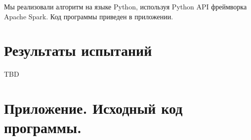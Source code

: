 \documentclass[12pt,a4paper]{report}
\begin{document}
Мы реализовали алгоритм на языке Python, используя Python API фреймворка Apache Spark. Код программы приведен в приложении.

\section{Результаты испытаний}

TBD

\newpage



\section{Приложение. Исходный код программы.}

\inputminted[fontsize=\footnotesize]{python}{../look_alike.py}
\end{document}
